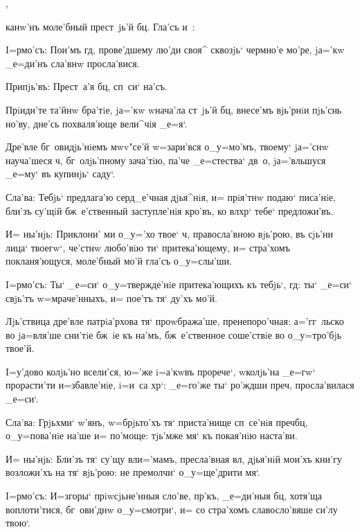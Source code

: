 ,

канw'нъ моле'бный прест~jь'й бц. Гла'съ и~:


I=рмо'съ: Пои'мъ гд, прове'дшему лю'ди своя^ 
сквозjь` чермно'е мо'ре, jа='кw _е=ди'нъ сла'внw 
просла'вися.

Припjь'въ: Прест~а'я бц, сп~си` на'съ.

Прiиди'те та'йнw бра'тiе, jа='кw w\т нача'ла ст~jь'й 
бц, внесе'мъ вjь'рнiи пjь'снь но'ву, дне'сь 
похваля'юще вели^чiя _е=я`.

Дре'вле бг~овидjь'нiемъ мwv"се'й w=зари'вся о_у=мо'мъ, 
твоему` jа='снw науча'шеся ч, бг~олjь'пному 
зача'тiю, па'че _е=стества` дв~о, jа='вльшуся _е=му` въ 
купинjь` саду`.

Сла'ва: Тебjь` предлага'ю серд_е'чная дjья^нiя, и= 
прiя'тнw подаю` писа'нiе, бли'зъ су'щiй бж~е'ственный 
заступле'нiя кро'въ, ко вл хр` тебе` 
предложи'въ.

И= ны'нjь: Приклони' ми о_у='хо твое` ч, 
правосла'вною вjь'рою, въ сjь'ни лица` твоегw`, че'стнw 
любо'вiю ти` притека'ющему, и= стра'хомъ покланя'ющуся, 
моле'бный мо'й гла'съ о_у=слы'ши.


I=рмо'съ: Ты` _е=си` о_у=твержде'нiе притека'ющихъ къ 
тебjь`, гд: ты` _е=си` свjь'тъ w=мраче'нныхъ, и= 
пое'тъ тя` ду'хъ мо'й.

Лjь'ствица дре'вле патрiа'рхова тя` проwбража'ше, 
пренепоро'чная: а='гг~льско во jа=вля'ше сни'тiе бж~iе къ 
на'мъ, бж~е'ственное соше'ствiе во о_у=тро'бjь твое'й.

I=у'дово колjь'но всели'ся, ю='же i=а'кwвъ прорече`, 
w\т колjь'на _е=гw` прорасти'ти и=збавле'нiе, i=и~са 
хр`: _е=го'же ты` ро'ждши преч, просла'вилася 
_е=си`.

Сла'ва: Грjьхми` w'янъ, w=брjьто'хъ тя` 
приста'нище сп~се'нiя преч бц, о_у=пова'нiе на'ше 
и= по'моще: тjь'мже мя` къ покая'нiю наста'ви.

И= ны'нjь: Бли'зъ тя` су'щу вл и='мамъ, 
пресла'вная вл, дjья'нiй мои'хъ кни'гу возложи'хъ на 
тя` вjь'рою: не премолчи` о_у=ще'дрити мя`.


I=рмо'съ: И=з\ъ горы` прiwсjьне'нныя сло'ве, 
пр'къ, _е=ди'ныя бц, хотя'ща воплоти'тися, 
бг~ови'днw о_у=смотри`, и= со стра'хомъ славосло'вяше 
си'лу твою`.

